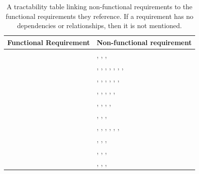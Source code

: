 \documentclass{article}
\begin{document}
\begin{table}[!h]
\begin{center}
\caption {A tractability table linking non-functional requirements to the functional requirements they reference. If a requirement has no dependencies or relationships, then it is not mentioned. }
\label{TRACE_FR_NFR}
\begin{tabular}{ | m{7cm} | m{7cm} | }
\hline
Functional Requirement & Non-functional requirement  \\
\hline
\nameref{STA_000} & \nameref{PERF_007}, \nameref{SAFE_001}, \nameref{SAFE_003}, \nameref{USE_003}  \\
\hline
\nameref{STA_001} & \nameref{PERF_002}, \nameref{PERF_004}, \nameref{PERF_005}, \nameref{PERF_006}, \nameref{PERF_007}, \nameref{SAFE_001}, \nameref{SAFE_003}, \nameref{USE_003}  \\
\hline
\nameref{STA_002} & \nameref{PERF_003}, \nameref{PERF_004}, \nameref{PERF_006}, \nameref{PERF_007}, \nameref{SAFE_001}, \nameref{SAFE_003}, \nameref{USE_003}  \\
\hline
\nameref{STA_003} & \nameref{PERF_001}, \nameref{PERF_004}, \nameref{PERF_007}, \nameref{SAFE_001}, \nameref{SAFE_003}, \nameref{USE_003}  \\
\hline
\nameref{STA_004} & \nameref{PERF_004}, \nameref{PERF_007}, \nameref{SAFE_001}, \nameref{SAFE_003}, \nameref{USE_003}  \\
\hline
\nameref{STA_005} & \nameref{PERF_004}, \nameref{PERF_007}, \nameref{SAFE_001}, \nameref{SAFE_003}  \\
\hline
\nameref{STA_006} & \nameref{PERF_002}, \nameref{PERF_004}, \nameref{PERF_006}, \nameref{PERF_007}, \nameref{SAFE_001}, \nameref{SAFE_003}, \nameref{USE_003}  \\
\hline
\nameref{STA_007} & \nameref{PERF_007}, \nameref{SAFE_001}, \nameref{SAFE_003}, \nameref{USE_003}  \\
\hline
\nameref{STA_008} & \nameref{PERF_007}, \nameref{SAFE_001}, \nameref{SAFE_003}, \nameref{USE_003}  \\
\hline
\nameref{STA_009} & \nameref{PERF_007}, \nameref{SAFE_001}, \nameref{SAFE_003}, \nameref{USE_003}  \\
\hline

\end{tabular}
\end{center}
\end{table}
\end{document}

